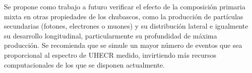Se propone como trabajo a futuro verificar el efecto de la composición primaria mixta en otras propiedades de los chubascos, como la producción de partículas secundarias (fotones, electrones o muones) y su distribución lateral e igualmente su desarrollo longitudinal, particularmente su profundidad de máxima producción. Se recomienda que se simule un mayor número de eventos que sea proporcional al espectro de UHECR medido, invirtiendo más recursos computacionales de los que se disponen actualmente.

\singlespacing
